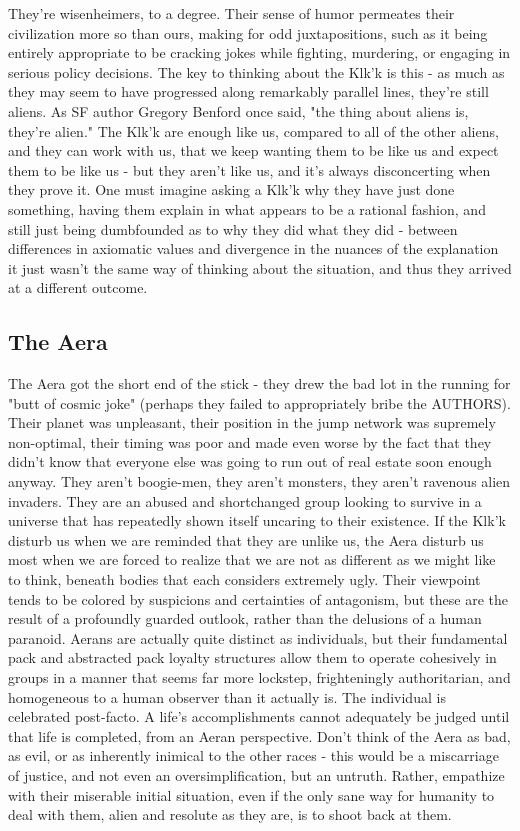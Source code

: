They're wisenheimers, to a degree. Their sense of humor permeates
their civilization more so than ours, making for odd juxtapositions,
such as it being entirely appropriate to be cracking jokes while
fighting, murdering, or engaging in serious policy decisions. The key
to thinking about the Klk'k is this - as much as they may seem to have
progressed along remarkably parallel lines, they're still aliens. As
SF author Gregory Benford once said, "the thing about aliens is,
they're alien." The Klk'k are enough like us, compared to all of the
other aliens, and they can work with us, that we keep wanting them to
be like us and expect them to be like us - but they aren't like us,
and it's always disconcerting when they prove it. One must imagine
asking a Klk'k why they have just done something, having them explain
in what appears to be a rational fashion, and still just being
dumbfounded as to why they did what they did - between differences in
axiomatic values and divergence in the nuances of the explanation it
just wasn't the same way of thinking about the situation, and thus
they arrived at a different outcome.

\subsection{The Aera}

The Aera got the short end of the stick - they drew the bad lot in the
running for "butt of cosmic joke" (perhaps they failed to
appropriately bribe the AUTHORS). Their planet was unpleasant, their
position in the jump network was supremely non-optimal, their timing
was poor and made even worse by the fact that they didn't know that
everyone else was going to run out of real estate soon enough
anyway. They aren't boogie-men, they aren't monsters, they aren't
ravenous alien invaders. They are an abused and shortchanged group
looking to survive in a universe that has repeatedly shown itself
uncaring to their existence. If the Klk'k disturb us when we are
reminded that they are unlike us, the Aera disturb us most when we are
forced to realize that we are not as different as we might like to
think, beneath bodies that each considers extremely ugly. Their
viewpoint tends to be colored by suspicions and certainties of
antagonism, but these are the result of a profoundly guarded outlook,
rather than the delusions of a human paranoid. Aerans are actually
quite distinct as individuals, but their fundamental pack and
abstracted pack loyalty structures allow them to operate cohesively in
groups in a manner that seems far more lockstep, frighteningly
authoritarian, and homogeneous to a human observer than it actually
is. The individual is celebrated post-facto. A life's accomplishments
cannot adequately be judged until that life is completed, from an
Aeran perspective. Don't think of the Aera as bad, as evil, or as
inherently inimical to the other races - this would be a miscarriage
of justice, and not even an oversimplification, but an
untruth. Rather, empathize with their miserable initial situation,
even if the only sane way for humanity to deal with them, alien and
resolute as they are, is to shoot back at them.

